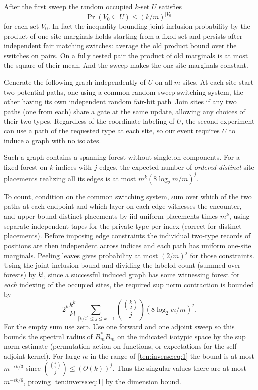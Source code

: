 After the first sweep the random occupied \(k\)-set \(U\) satisfies
\[
 \Pr(V_0\subseteq U)\le (k/m)^{|V_0|}
\]
for each set \(V_0\). In fact the inequality bounding joint inclusion probability by the product of one-site marginals holds starting from a fixed set and persists after independent fair matching switches: average the old product bound over the switches on pairs. On a fully tested pair the product of old marginals is at most the square of their mean. And the sweep makes the one-site marginals constant.

Generate the following graph independently of \(U\) on all \(m\) sites. At each site start two potential paths, one using a common random sweep switching system, the other having its own independent random fair-bit path. Join sites if any two paths (one from each) share a gate at the same update, allowing any choices of their two types. Regardless of the coordinate labeling of \(U\), the second experiment can use a path of the requested type at each site, so our event requires \(U\) to induce a graph with no isolates.

Such a graph contains a spanning forest without singleton components. For a fixed forest on \(k\) indices with \(j\) edges, the expected number of \emph{ordered distinct} site placements realizing all its edges is at most \(m^k(8\log_2 m/m)^j\).

To count, condition on the common switching system, sum over which of the two paths at each endpoint and which layer on each edge witnesses the encounter, and upper bound distinct placements by iid uniform placements times \(m^k\), using separate independent tapes for the private type per index (correct for distinct placements). Before imposing edge constraints the individual two-type records of positions are then independent across indices and each path has uniform one-site marginals. Peeling leaves gives probability at most \((2/m)^j\) for those constraints. Using the joint inclusion bound and dividing the labeled count (summed over forests) by \(k!\), since a successful induced graph has some witnessing forest for \emph{each} indexing of the occupied sites, the required sup norm contraction is bounded by
\[
 2^k \frac{k^k}{k!}\sum_{\lceil k/2\rceil\le j\le k-1}
 \binom{\binom{k}{2}}{j}(8\log_2 m/m)^j.
\]
For the empty sum use zero. Use one forward and one adjoint sweep so this bounds the spectral radius of \(B_m^*B_m\) on the indicated isotypic space by the sup norm estimate (permutation action on functions, or expectations for the self-adjoint kernel). For large \(m\) in the range of \eqref{ten:inverse:eq:1} the bound is at most \(m^{-\epsilon k/3}\) since \(\binom{\binom{k}{2}}j\le(O(k))^j\). Thus the singular values there are at most \(m^{-\epsilon k/6}\), proving \eqref{ten:inverse:eq:1} by the dimension bound.

